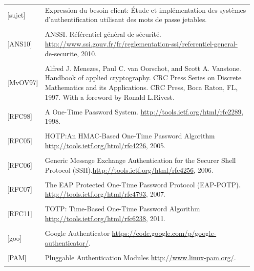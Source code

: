 \documentclass{"../../res/univ-projet"}
\begin{document}
\begin{tabular}{p{}>{\raggedright\arraybackslash}p{13cm}}
{\label{[sujet]}[sujet]} & {Expression du besoin client: Étude et implémentation des systèmes d'authentification utilisant des mots de passe jetables.}
\tabularnewline
\\
{\label{[ANS10]}[ANS10]} & {ANSSI. Référentiel général de sécurité. \href{http://www.ssi.gouv.fr/fr/reglementation-ssi/referentiel-general-de-securite}{http://www.ssi.gouv.fr/fr/reglementation-ssi/referentiel-general-de-securite}, 2010.}
\tabularnewline
\\
{\label{[MvOV97]}[MvOV97]} & {Alfred J. Menezes, Paul C. van Oorschot, and Scott A. Vanstone. Handbook of applied cryptography. CRC Press Series on Discrete Mathematics and its Applications. CRC Press, Boca Raton, FL, 1997. With a foreword by Ronald L.Rivest.}
\tabularnewline
\\
{\label{[RFC98]}[RFC98]} & {A One-Time Password System. \href{http://tools.ietf.org/html/rfc2289}{http://tools.ietf.org/html/rfc2289}, 1998.}
\tabularnewline
\\
{\label{[RFC05]}[RFC05]} & {HOTP:An HMAC-Based One-Time Password Algorithm \href{http://tools.ietf.org/html/rfc4226}{http://tools.ietf.org/html/rfc4226}, 2005.}
\tabularnewline
\\
{\label{[RFC06]}[RFC06]} & {Generic Message Exchange Authentication for the Securer Shell Protocol (SSH).\href{http://tools.ietf.org/html/rfc4256}{http://tools.ietf.org/html/rfc4256}, 2006.}
\tabularnewline
\\
{\label{[RFC07]}[RFC07]} & {The EAP Protected One-Time Password Protocol (EAP-POTP). \href{http://tools.ietf.org/html/rfc4793}{http://tools.ietf.org/html/rfc4793}, 2007.}
\tabularnewline
\\
{\label{[RFC11]}[RFC11]} & {TOTP: Time-Based One-Time Password Algorithm \href{http://tools.ietf.org/html/rfc6238}{http://tools.ietf.org/html/rfc6238}, 2011.}
\tabularnewline
\\
{\label{[goo]}[goo]} & {Google Authenticator \href{https://code.google.com/p/google-authenticator/}{https://code.google.com/p/google-authenticator/}.}
\tabularnewline
\\
{\label{[PAM]}[PAM]} & {Pluggable Authentication Modules \href{http://www.linux-pam.org/}{http://www.linux-pam.org/}.}
\tabularnewline
\\
\end{tabular}

\end{document}
